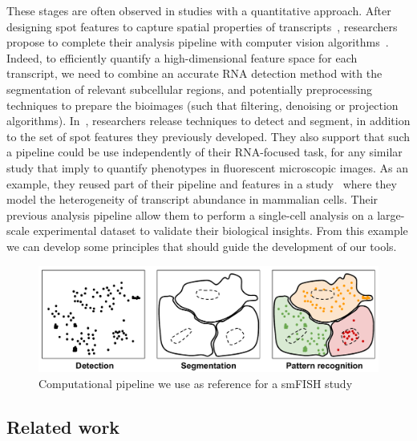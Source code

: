 \noindent
{}
These stages are often observed in studies with a quantitative approach.
After designing spot features to capture spatial properties of transcripts~\cite{battich_image-based_2013}, researchers propose to complete their analysis pipeline with computer vision algorithms~\cite{stoeger_computer_2015}.
Indeed, to efficiently quantify a high-dimensional feature space for each transcript, we need to combine an accurate \ac{RNA} detection method with the segmentation of relevant subcellular regions, and potentially preprocessing techniques to prepare the bioimages (such that filtering, denoising or projection algorithms).
In~\cite{stoeger_computer_2015}, researchers release techniques to detect and segment, in addition to the set of spot features they previously developed.
They also support that such a pipeline could be use independently of their \ac{RNA}-focused task, for any similar study that imply to quantify phenotypes in fluorescent microscopic images.
As an example, they reused part of their pipeline and features in a study~\cite{battich_control_2015} where they model the heterogeneity of transcript abundance in mammalian cells.
Their previous analysis pipeline allow them to perform a single-cell analysis on a large-scale experimental dataset to validate their biological insights.
From this example we can develop some principles that should guide the development of our tools.



\begin{figure}[h]
    \centering
    \includegraphics[width=\textwidth]{figures/chapter1/schema_pipeline}
    \caption{Computational pipeline we use as reference for a smFISH study}
    \label{fig:pipeline}
\end{figure}

\subsection{Related work}
\label{subsec:related_work_fishquant}

